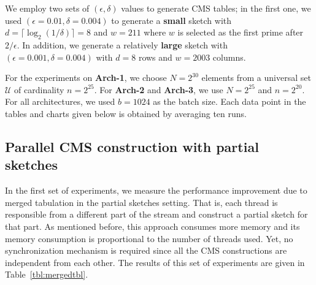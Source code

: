 \documentclass[10pt, review=true,sigconf]{acmart}
\begin{document}
We employ two sets of $(\epsilon, \delta)$ values to generate CMS tables; in the first one, we used $(\epsilon = 0.01, \delta = 0.004)$ to generate a {\bf small} sketch with $d = \lceil \log_2(1/\delta) \rceil = 8$ and $w = 211$ where $w$ is selected as the first prime after $2/\epsilon$. In addition, we generate a relatively {\bf large} sketch with $(\epsilon = 0.001, \delta = 0.004)$ with $d = 8$ rows and $w = 2003$ columns.

For the experiments on {\bf Arch-1}, we choose $N = 2^{30}$ elements from a universal set $\mathcal{U}$ of cardinality $n = 2^{25}$. For {\bf Arch-2} and   {\bf Arch-3}, we use $N = 2^{25}$ and $n = 2^{20}$. For all architectures, we used $b = 1024$ as the batch size. Each data point in the tables and charts given below is obtained by averaging ten runs. 

\subsection{Parallel CMS construction with partial sketches}

In the first set of experiments, we measure the performance improvement due to merged tabulation in the partial sketches setting. That is, each thread is responsible from a different part of the stream and construct a partial sketch for that part. As mentioned before, this approach consumes more memory and its memory consumption is proportional to the number of threads used. Yet, no synchronization mechanism is required since all the CMS constructions are independent from each other. The results of this set of experiments are given in Table~\ref{tbl:mergedtbl}. 
\end{document}

